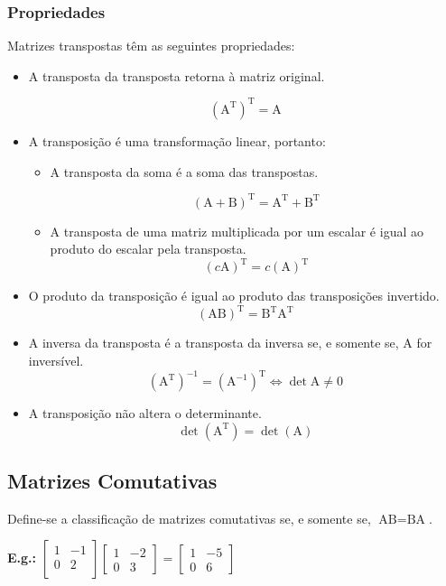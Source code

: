 \documentclass[a4paper,12pt]{article}
\begin{document}
\subsubsection{Propriedades}
Matrizes transpostas têm as seguintes propriedades:
\begin{itemize}

    \item A transposta da transposta retorna à matriz original.
    
    $$ (\text{A}^{\text{T}})^{\text{T}} = \text{A}$$
     \item A transposição é uma transformação linear, portanto:
    \begin{itemize}
        \item  A transposta da soma é a soma das transpostas.
    
    $$ (\text{A}+\text{B}) ^\text{T} = \text{A}^\text{T} + \text{B}^\text{T}$$

 \item A transposta de uma matriz multiplicada por um escalar é igual ao produto do escalar pela transposta.
    $$(c \text{A})^\text{T} = c (\text{A})^\text{T}$$
    \end{itemize}
    
    \item O produto da transposição é igual ao produto das transposições invertido.
    $$(\text{A} \text{B} )^\text{T} = \text{B}^\text{T} \text{A}^\text{T}$$

    \item A inversa da transposta é a transposta da inversa se, e somente se, $\text{A}$ for inversível. $$(\text{A}^\text{T})^{-1} = (\text{A}^{-1})^\text{T} \Leftrightarrow \det \text{A} \neq 0$$
    
    \item A transposição não altera o determinante.
    $$ \det(\text{A}^\text{T}) = \det(\text{A}) $$
  
\end{itemize}

\subsection{Matrizes Comutativas}

Define-se a classificação de matrizes comutativas se, e somente se, $ \text{A} \text{B} = \text{B} \text{A} $.

\textbf{E.g.:} $ \begin{bmatrix}
1 & -1 \\
0 & 2 \\
\end{bmatrix} 
\begin{bmatrix}
1 & -2 \\
0 & 3
\end{bmatrix}
 = \begin{bmatrix}
 1 & -5 \\
 0 & 6
 \end{bmatrix}$
 
\end{document}
